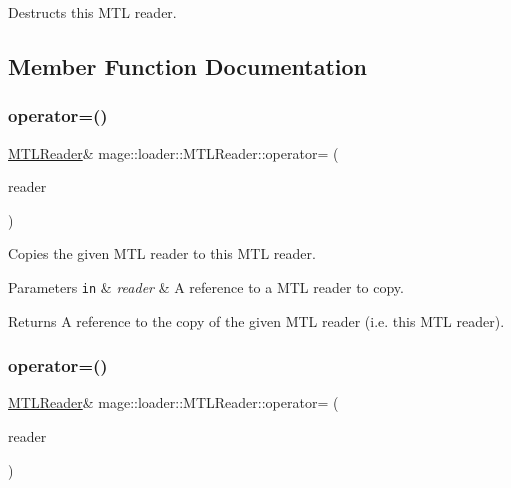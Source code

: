 Destructs this M\+TL reader. 

\subsection{Member Function Documentation}
\hypertarget{classmage_1_1loader_1_1_m_t_l_reader_a2a06066535d68e35fd1456b683953947}{}\label{classmage_1_1loader_1_1_m_t_l_reader_a2a06066535d68e35fd1456b683953947} 
\subsubsection{\texorpdfstring{operator=()}{operator=()}\hspace{0.1cm}{\footnotesize\ttfamily [1/2]}}
{\footnotesize\ttfamily \hyperlink{classmage_1_1loader_1_1_m_t_l_reader}{M\+T\+L\+Reader}\& mage\+::loader\+::\+M\+T\+L\+Reader\+::operator= (\begin{DoxyParamCaption}\item[{const \hyperlink{classmage_1_1loader_1_1_m_t_l_reader}{M\+T\+L\+Reader} \&}]{reader }\end{DoxyParamCaption})\hspace{0.3cm}{\ttfamily [delete]}}

Copies the given M\+TL reader to this M\+TL reader.


\begin{DoxyParams}[1]{Parameters}
\mbox{\tt in}  & {\em reader} & A reference to a M\+TL reader to copy. \\
\hline
\end{DoxyParams}
\begin{DoxyReturn}{Returns}
A reference to the copy of the given M\+TL reader (i.\+e. this M\+TL reader). 
\end{DoxyReturn}
\hypertarget{classmage_1_1loader_1_1_m_t_l_reader_ad5b378d2d0959236f07a6cf8ad086c32}{}\label{classmage_1_1loader_1_1_m_t_l_reader_ad5b378d2d0959236f07a6cf8ad086c32} 
\subsubsection{\texorpdfstring{operator=()}{operator=()}\hspace{0.1cm}{\footnotesize\ttfamily [2/2]}}
{\footnotesize\ttfamily \hyperlink{classmage_1_1loader_1_1_m_t_l_reader}{M\+T\+L\+Reader}\& mage\+::loader\+::\+M\+T\+L\+Reader\+::operator= (\begin{DoxyParamCaption}\item[{\hyperlink{classmage_1_1loader_1_1_m_t_l_reader}{M\+T\+L\+Reader} \&\&}]{reader }\end{DoxyParamCaption})\hspace{0.3cm}{\ttfamily [delete]}}

